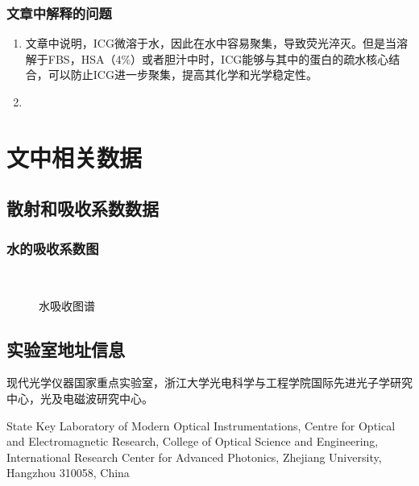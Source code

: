 \documentclass[cn,11pt,chinese]{elegantbook}
\begin{document}
\subsection{文章中解释的问题}
\begin{enumerate}[itemsep=1.5ex]
   \item {}
  文章中说明，ICG微溶于水，因此在水中容易聚集，导致荧光淬灭。但是当溶解于FBS，HSA（4\%）或者胆汁中时，ICG能够与其中的蛋白的疏水核心结合，可以防止ICG进一步聚集，提高其化学和光学稳定性。
   \item {}

 \end{enumerate} 


\appendix
\chapter{文中相关数据}

\section{散射和吸收系数数据}

\subsection{水的吸收系数图}
\begin{figure}[h]
	\centering
	 \\
  \caption{水吸收图谱}
	\label{fig:waterabs}
\end{figure}

\section{实验室地址信息}
现代光学仪器国家重点实验室，浙江大学光电科学与工程学院国际先进光子学研究中心，光及电磁波研究中心。

State Key Laboratory of Modern Optical Instrumentations, Centre for Optical and
Electromagnetic Research, College of Optical Science and Engineering, International
Research Center for Advanced Photonics, Zhejiang University, Hangzhou 310058, China
\end{document}
